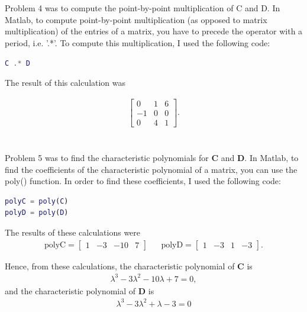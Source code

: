 \documentclass{article}
\begin{document}
\section{}

Problem 4 was to compute the point-by-point multiplication of C and D.  In Matlab, to compute point-by-point multiplication (as opposed to matrix multiplication) of the entries of a matrix, you have to precede the operator with a period, i.e. '.*'.  To compute this multiplication, I used the following code: 

\begin{lstlisting}[language=Matlab]
% Compute the point-by-point multiplication of C and D.
C .* D
\end{lstlisting}

The result of this calculation was

\begin{align*}
    \begin{bmatrix}
    0 & 1 & 6\\
    -1 & 0 & 0\\
    0 & 4 & 1
    \end{bmatrix}.
\end{align*}

\section{}

Problem 5 was to find the characteristic polynomials for \textbf{C} and \textbf{D}.  In Matlab, to find the coefficients of the characteristic polynomial of a matrix, you can use the poly() function.  In order to find these coefficients, I used the following code:

\begin{lstlisting}[language=Matlab]
% Find the characteristic polynomials for C and D.
polyC = poly(C)
polyD = poly(D)
\end{lstlisting}

The results of these calculations were
\begin{align*}
    \text{polyC} = \begin{bmatrix}
    1 & -3 & -10 & 7
    \end{bmatrix} && \text{polyD} = \begin{bmatrix}
    1 & -3 & 1 & -3
    \end{bmatrix}.
\end{align*}

Hence, from these calculations, the characteristic polynomial of \textbf{C} is
\begin{align*}
    \lambda^3 -3\lambda^2 -10\lambda +7 = 0,
\end{align*}
and the characteristic polynomial of \textbf{D} is 
\begin{align*}
    \lambda^3 -3\lambda^2 + \lambda -3 = 0
\end{align*}
\end{document}
